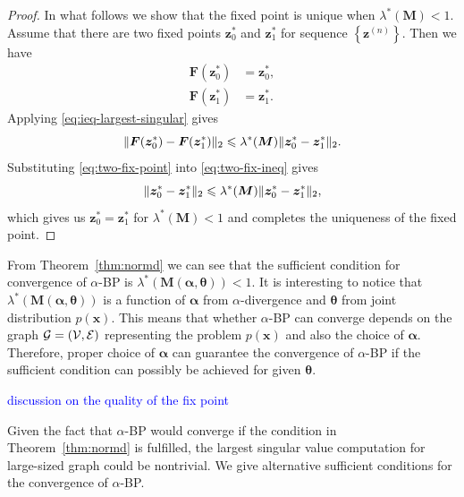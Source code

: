 \begin{proof}
  In what follows we show that the fixed point is unique when $\lambda^{\ast}(\bm{M})<1$. Assume that there are two fixed points $\bm{z}_0^{\ast}$ and $\bm{z}_1^{\ast}$ for sequence $\left\{ \bm{z}^{(n)} \right\}$. Then we have
  \begin{align}\label{eq:two-fix-point}
    \bm{F}(\bm{z}_0^{\ast}) &= \bm{z}_0^{\ast}, \nonumber\\
    \bm{F}(\bm{z}_1^{\ast}) &= \bm{z}_1^{\ast}. 
  \end{align}
  Applying \eqref{eq:ieq-largest-singular} gives
  \begin{equation}\label{eq:two-fix-ineq}
    \| \bm{F}(\bm{z}_0^{\ast}) - \bm{F}(\bm{z}_1^{\ast}) \|_{2} \leqslant
    \lambda^{\ast}(\bm{M})\| \bm{z}_0^{\ast} - \bm{z}_1^{\ast} \|_{2}.
  \end{equation}
  Substituting \eqref{eq:two-fix-point} into \eqref{eq:two-fix-ineq}
  gives
  \begin{equation}
    \| \bm{z}_0^{\ast} - \bm{z}_1^{\ast} \|_{2} \leqslant
    \lambda^{\ast}(\bm{M})\| \bm{z}_0^{\ast} - \bm{z}_1^{\ast} \|_{2},
  \end{equation}
  which gives us $\bm{z}_0^{\ast} = \bm{z}_1^{\ast}$ for $\lambda^{\ast}(\bm{M})<1$ and completes the uniqueness of the fixed point.
\end{proof}

\begin{remark}
  From Theorem~\ref{thm:normd} we can see that the sufficient condition for convergence of $\alpha$-BP is $\lambda^{\ast}(\bm{M}(\bm{\alpha}, \bm{\theta})) < 1$. It is interesting to notice that $\lambda^{\ast}(\bm{M}(\bm{\alpha}, \bm{\theta}))$ is a function of $\bm{\alpha}$ from $\alpha$-divergence and $\bm{\theta}$ from joint distribution $p(\bm{x})$. This means that whether $\alpha$-BP can converge depends on the graph $\mathcal{G}= (\mathcal{V}, \mathcal{E})$ representing the problem $p(\bm{x})$ and also the choice of $\bm{\alpha}$. Therefore, proper choice of $\bm{\alpha}$ can guarantee the convergence of $\alpha$-BP if the sufficient condition can possibly be achieved for given $\bm{\theta}$.
\end{remark}

\begin{remark}
\textcolor{blue}{discussion on the quality of the fix point}
\end{remark}

Given the fact that $\alpha$-BP would converge if the condition in Theorem~\ref{thm:normd} is fulfilled, the largest singular value computation for large-sized graph could be nontrivial. We give alternative sufficient conditions for the convergence of $\alpha$-BP.

